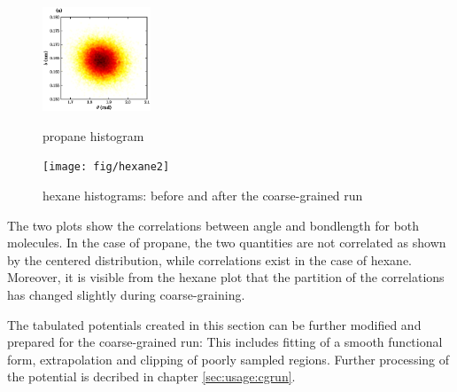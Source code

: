 \begin{figure}[b]
\begin{minipage}{4cm}
  \includegraphics[height=3.1cm]{fig/propane_hist2d}
  \caption{propane histogram}
  \label{boltzmann:propane}
\end{minipage}
\hfill
\begin{minipage}{10cm}
  \texttt{[image: fig/hexane2]}
  \caption{hexane histograms: before and after the coarse-grained run}
  \label{boltzmann:hexane}
\end{minipage}
\end{figure}

The two plots show the correlations between angle and bondlength for both molecules. In the case of propane, the two quantities are not correlated as shown by the centered distribution, while correlations exist in the case of hexane. Moreover, it is visible from the hexane plot that the partition of the correlations has changed slightly during coarse-graining.

The tabulated potentials created in this section can be further modified and prepared for the coarse-grained run: This includes fitting of a smooth functional form, extrapolation and clipping of poorly sampled regions. Further processing of the potential is decribed in chapter \ref{sec:usage:cgrun}.